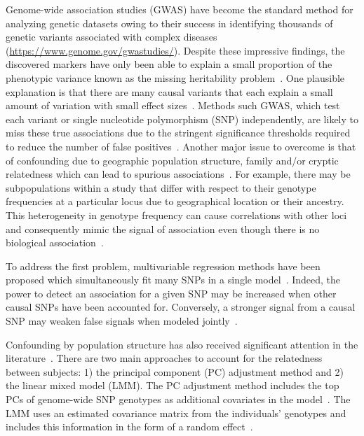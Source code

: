 \documentclass[12pt,letter]{article}\usepackage[]{graphicx}\usepackage[]{color}
\begin{document}
Genome-wide association studies (GWAS) have become the standard method for analyzing genetic datasets owing to their success in identifying thousands of genetic variants associated with complex diseases (\url{https://www.genome.gov/gwastudies/}).
Despite these impressive findings, the discovered markers have only been able to explain a small proportion of the phenotypic variance known as the missing heritability problem~\citep{manolio2009finding}.
One plausible explanation is that there are many causal variants that each explain a small amount of variation with small effect sizes~\citep{yang2010common}.
Methods such GWAS, which test each variant or single nucleotide polymorphism (SNP) independently, are likely to miss these true associations due to the stringent significance thresholds required to reduce the number of false positives~\citep{manolio2009finding}. 
Another major issue to overcome is that of confounding due to geographic population structure, family and/or cryptic relatedness which can lead to spurious associations~\citep{astle2009population}.
For example, there may be subpopulations within a study that differ with respect to their genotype frequencies at a particular locus due to geographical location or their ancestry.
This heterogeneity in genotype frequency can cause correlations with other loci and consequently mimic the signal of association even though there is no biological association~\citep{song2015testing,marchini2004effects}.


To address the first problem, multivariable regression methods have been proposed which simultaneously fit many SNPs in a single model~\citep{hoggart2008simultaneous,li2010bayesian}. Indeed, the power to detect an association for a given SNP may be increased when other causal SNPs have been accounted for. Conversely, a stronger signal from a causal SNP may weaken false signals when modeled jointly~\citep{hoggart2008simultaneous}. 

Confounding by population structure has also received significant attention in the literature~\citep{lippert2011fast,kang2010variance,yu2006unified,eu2014comparison}. 
There are two main approaches to account for the relatedness between subjects: 1) the principal component (PC) adjustment method and 2) the linear mixed model (LMM).
The PC adjustment method includes the top PCs of genome-wide SNP genotypes as additional covariates in the model~\citep{price2006principal}. 
The LMM uses an estimated covariance matrix from the individuals' genotypes and includes this information in the form of a random effect~\cite{astle2009population}. 
\end{document}
